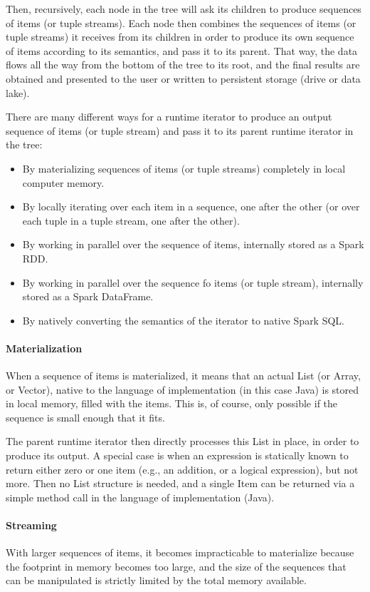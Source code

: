 Then, recursively, each node in the tree will ask its children to produce sequences of items (or tuple streams). Each node then combines the sequences of items (or tuple streams) it receives from its children in order to produce its own sequence of items according to its semantics, and pass it to its parent. That way, the data flows all the way from the bottom of the tree to its root, and the final results are obtained and presented to the user or written to persistent storage (drive or data lake).

There are many different ways for a runtime iterator to produce an output sequence of items (or tuple stream) and pass it to its parent runtime iterator in the tree:

\begin{itemize}
    \item By materializing sequences of items (or tuple streams) completely in local computer memory.
    \item By locally iterating over each item in a sequence, one after the other (or over each tuple in a tuple stream, one after the other).
    \item By working in parallel over the sequence of items, internally stored as a Spark RDD.
    \item By working in parallel over the sequence fo items (or tuple stream), internally stored as a Spark DataFrame.
    \item By natively converting the semantics of the iterator to native Spark SQL.
\end{itemize}

\paragraph{Materialization}
When a sequence of items is materialized, it means that an actual List (or Array, or Vector), native to the language of implementation (in this case Java) is stored in local memory, filled with the items. This is, of course, only possible if the sequence is small enough that it fits.

The parent runtime iterator then directly processes this List in place, in order to produce its output.
A special case is when an expression is statically known to return either zero or one item (e.g., an addition, or a logical expression), but not more. Then no List structure is needed, and a single Item can be returned via a simple method call in the language of implementation (Java).

\paragraph{Streaming}
With larger sequences of items, it becomes impracticable to materialize because the footprint in memory becomes too large, and the size of the sequences that can be manipulated is strictly limited by the total memory available.


